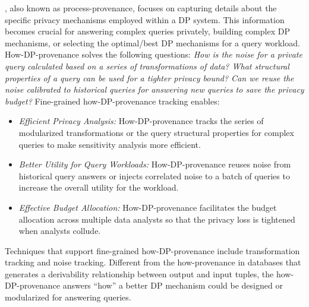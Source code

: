 , also known as process-provenance, focuses on capturing details about the specific privacy mechanisms employed within a DP system. This information becomes crucial for answering complex queries privately, building complex DP mechanisms, or selecting the optimal/best DP mechanisms for a query workload.
How-DP-provenance solves the following questions: \emph{How is the noise for a private query calculated based on a series of transformations of data? What structural properties of a query can be used for a tighter privacy bound? Can we reuse the noise calibrated to historical queries for answering new queries to save the privacy budget?}
Fine-grained how-DP-provenance tracking enables: 
\begin{itemize}
    \item \emph{Efficient Privacy Analysis:} How-DP-provenance tracks the series of modularized transformations or the query structural properties for complex queries to make sensitivity analysis more efficient.
    \item \emph{Better Utility for Query Workloads:} How-DP-provenance reuses noise from historical query answers or injects correlated noise to a batch of queries to increase the overall utility for the workload.
    \item \emph{Effective Budget Allocation:} How-DP-provenance facilitates the budget allocation across multiple data analysts so that the privacy loss is tightened when analysts collude.
\end{itemize}
Techniques that support fine-grained how-DP-provenance include transformation tracking and noise tracking.
Different from the how-provenance in databases that generates a derivability relationship between output and input tuples, the how-DP-provenance answers ``how'' a better DP mechanism could be designed or modularized for answering queries.




